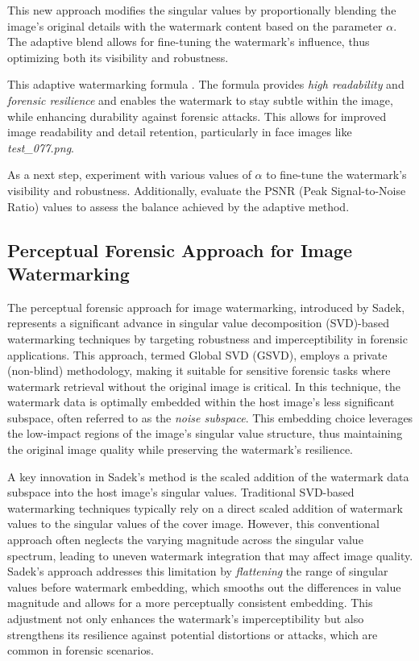 \documentclass[
  journal,
]{IEEEtran}%
\begin{document}
This new approach modifies the singular values by proportionally
blending the image's original details with the watermark content based
on the parameter \(\alpha\). The adaptive blend allows for fine-tuning
the watermark's influence, thus optimizing both its visibility and
robustness.

This adaptive watermarking formula . The formula provides \emph{high
readability} and \emph{forensic resilience} and enables the watermark to
stay subtle within the image, while enhancing durability against
forensic attacks. This allows for improved image readability and detail
retention, particularly in face images like \emph{test\_077.png}.

As a next step, experiment with various values of \(\alpha\) to
fine-tune the watermark's visibility and robustness. Additionally,
evaluate the PSNR (Peak Signal-to-Noise Ratio) values to assess the
balance achieved by the adaptive method.

\subsection{Perceptual Forensic Approach for Image
Watermarking}\label{perceptual-forensic-approach-for-image-watermarking}

The perceptual forensic approach for image watermarking, introduced by
Sadek, represents a significant advance in singular value decomposition
(SVD)-based watermarking techniques by targeting robustness and
imperceptibility in forensic applications. This approach, termed Global
SVD (GSVD), employs a private (non-blind) methodology, making it
suitable for sensitive forensic tasks where watermark retrieval without
the original image is critical. In this technique, the watermark data is
optimally embedded within the host image's less significant subspace,
often referred to as the \emph{noise subspace}. This embedding choice
leverages the low-impact regions of the image's singular value
structure, thus maintaining the original image quality while preserving
the watermark's resilience.

A key innovation in Sadek's method is the scaled addition of the
watermark data subspace into the host image's singular values.
Traditional SVD-based watermarking techniques typically rely on a direct
scaled addition of watermark values to the singular values of the cover
image. However, this conventional approach often neglects the varying
magnitude across the singular value spectrum, leading to uneven
watermark integration that may affect image quality. Sadek's approach
addresses this limitation by \emph{flattening} the range of singular
values before watermark embedding, which smooths out the differences in
value magnitude and allows for a more perceptually consistent embedding.
This adjustment not only enhances the watermark's imperceptibility but
also strengthens its resilience against potential distortions or
attacks, which are common in forensic scenarios.
\end{document}
